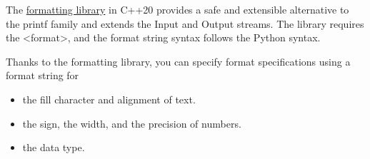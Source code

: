
The \href{https://en.cppreference.com/w/cpp/utility/format}{formatting library} in C++20 provides a safe and extensible alternative to the printf family and extends the Input and Output streams. The library requires the <format>, and the format string syntax follows the Python syntax.

Thanks to the formatting library, you can specify format specifications using a format string for

\begin{itemize}
\item 
the fill character and alignment of text.

\item 
the sign, the width, and the precision of numbers.

\item 
the data type.
\end{itemize}



















